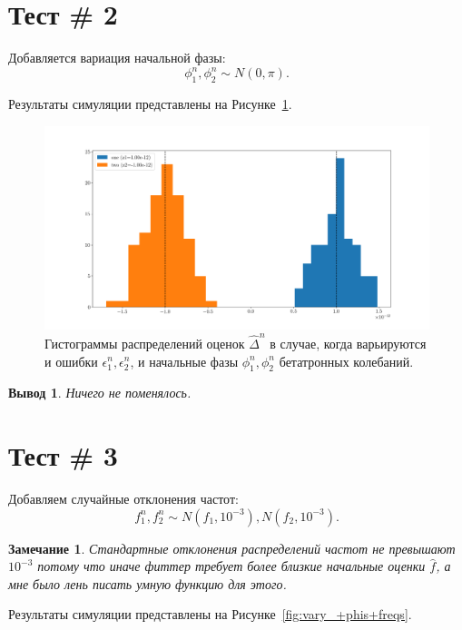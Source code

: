 \documentclass[12pt]{report}
\newcommand{\ntrl}{n}
\newtheorem{rmk}{Замечание}
\newtheorem{concl}{Вывод}
\begin{document}
\section{Тест \# 2}
Добавляется вариация начальной фазы:
\[
	\phi_1^{\ntrl}, \phi_2^{\ntrl} \sim N\left(0, \pi\right).
\]

Результаты симуляции представлены на Рисунке~\ref{fig:vary_+phis}.

\begin{figure}[h]\centering
	\includegraphics[width=\linewidth]{../../img/Koop/CO_offset_b1_b2_hist_vary_+phis}
	\caption{Гистограммы распределений оценок $\hat{\Delta}^{\ntrl}$ в случае, когда варьируются и ошибки $\epsilon_1^{\ntrl},\epsilon_2^{\ntrl}$, и начальные фазы $\phi_1^{\ntrl},\phi_2^{\ntrl}$ бетатронных колебаний. \label{fig:vary_+phis}}
\end{figure}

\begin{concl}
	Ничего не поменялось.
\end{concl}

\section{Тест \# 3}
Добавляем случайные отклонения частот:
\[
f_1^{\ntrl}, f_2^{\ntrl}\sim N(f_1, 10^{-3}),N(f_2,10^{-3}).
\]

\begin{rmk}
	Стандартные отклонения распределений частот не превышают $10^{-3}$ потому что иначе фиттер требует более близкие начальные оценки $\hat{f}$, а мне было лень писать умную функцию для этого.
\end{rmk}

Результаты симуляции представлены на Рисунке~\ref{fig:vary_+phis+freqs}.
\end{document}

